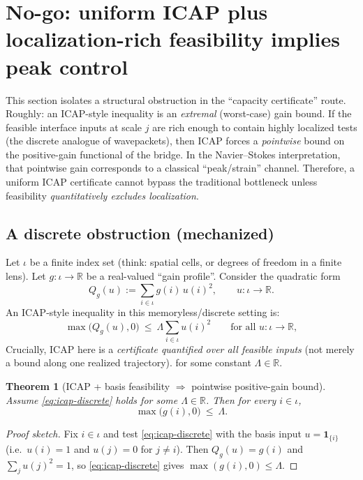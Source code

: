 \documentclass[11pt]{article}
\newcommand{\R}{\mathbb{R}}
\newtheorem{theorem}{Theorem}
\begin{document}
 \section{No-go: uniform ICAP plus localization-rich feasibility implies peak control}
\label{sec:no-go-icap}

This section isolates a structural obstruction in the ``capacity certificate'' route.
Roughly: an ICAP-style inequality is an \emph{extremal} (worst-case) gain bound.
If the feasible interface inputs at scale $j$ are rich enough to contain highly localized tests
(the discrete analogue of wavepackets), then ICAP forces a \emph{pointwise} bound on the
positive-gain functional of the bridge.
In the Navier--Stokes interpretation, that pointwise gain corresponds to a classical
``peak/strain'' channel.
Therefore, a uniform ICAP certificate cannot bypass the traditional bottleneck unless feasibility
\emph{quantitatively excludes localization}.

\subsection{A discrete obstruction (mechanized)}

Let $\iota$ be a finite index set (think: spatial cells, or degrees of freedom in a finite lens).
Let $g:\iota\to\R$ be a real-valued ``gain profile''.
Consider the quadratic form
\[
Q_g(u) := \sum_{i\in\iota} g(i)\,u(i)^2,
\qquad u:\iota\to\R.
\]
An ICAP-style inequality in this memoryless/discrete setting is:
\begin{equation}\label{eq:icap-discrete}
\max\!\big(Q_g(u),0\big)\ \le\ \Lambda \sum_{i\in\iota} u(i)^2
\qquad\text{for all }u:\iota\to\R,
\end{equation}
Crucially, ICAP here is a \emph{certificate quantified over all feasible inputs} (not merely a bound along one realized trajectory).
for some constant $\Lambda\in\R$.

\begin{theorem}[ICAP + basis feasibility $\Rightarrow$ pointwise positive-gain bound]
\label{thm:icap-no-go}
Assume \eqref{eq:icap-discrete} holds for some $\Lambda\in\R$.
Then for every $i\in\iota$,
\[
\max\!\big(g(i),0\big)\ \le\ \Lambda.
\]
\end{theorem}

\begin{proof}[Proof sketch]
Fix $i\in\iota$ and test \eqref{eq:icap-discrete} with the basis input
$u=\mathbf{1}_{\{i\}}$ (i.e.\ $u(i)=1$ and $u(j)=0$ for $j\neq i$).
Then $Q_g(u)=g(i)$ and $\sum_j u(j)^2=1$, so \eqref{eq:icap-discrete} gives
$\max(g(i),0)\le \Lambda$.
\end{proof}
\end{document}
